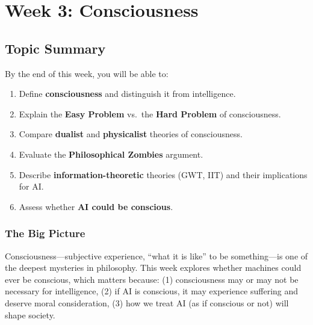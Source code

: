 \section{Week 3: Consciousness}

\subsection{Topic Summary}

\begin{keybox}
By the end of this week, you will be able to:
\begin{enumerate}
  \item Define \textbf{consciousness} and distinguish it from intelligence.
  \item Explain the \textbf{Easy Problem} vs.\ the \textbf{Hard Problem} of consciousness.
  \item Compare \textbf{dualist} and \textbf{physicalist} theories of consciousness.
  \item Evaluate the \textbf{Philosophical Zombies} argument.
  \item Describe \textbf{information-theoretic} theories (GWT, IIT) and their implications for AI.
  \item Assess whether \textbf{AI could be conscious}.
\end{enumerate}
\end{keybox}

\separator

\subsubsection*{The Big Picture}

Consciousness---subjective experience, ``what it is like'' to be something---is one of the deepest mysteries in philosophy. This week explores whether machines could ever be conscious, which matters because: (1) consciousness may or may not be necessary for intelligence, (2) if AI is conscious, it may experience suffering and deserve moral consideration, (3) how we treat AI (as if conscious or not) will shape society.

